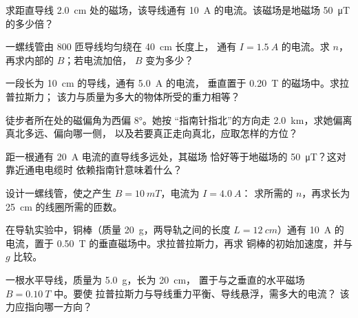 \begin{exercise}[$\star$]\label{exo:g11:magnetic-fields:3}
求距直导线 \qty{2.0}{cm} 处的磁场，该导线通有
\qty{10}{A} 的电流。该磁场是地磁场 \qty{50}{\micro T} 的多少倍？
\end{exercise}

\begin{exercise}[$\star$]\label{exo:g11:magnetic-fields:4}
一螺线管由 $800$ 匝导线均匀绕在 \qty{40}{cm} 长度上，
通有 $I = \qty{1.5}{A}$ 的电流。求 $n$，再求内部的 $B$；若电流加倍，
$B$ 变为多少？
\end{exercise}

\begin{exercise}[$\star$]\label{exo:g11:magnetic-fields:5}
一段长为 \qty{10}{cm} 的导线，通有 \qty{5.0}{A} 的电流，
垂直置于 \qty{0.20}{T} 的磁场中。求拉普拉斯力；
该力与质量为多大的物体所受的重力相等？
\end{exercise}

\begin{exercise}[$\star\star$]\label{exo:g11:magnetic-fields:6}
徒步者所在处的磁偏角为西偏 $\ang{8}$。她按
“指南针指北”的方向走 \qty{2.0}{km}，求她偏离真北多远、偏向哪一侧，
以及若要真正走向真北，应取怎样的方位？
\end{exercise}

\begin{exercise}[$\star\star$]\label{exo:g11:magnetic-fields:7}
距一根通有 \qty{20}{A} 电流的直导线多远处，其磁场
恰好等于地磁场的 \qty{50}{\micro T}？这对靠近通电电缆时
依赖指南针意味着什么？
\end{exercise}

\begin{exercise}[$\star\star$]\label{exo:g11:magnetic-fields:8}
设计一螺线管，使之产生 $B = \qty{10}{mT}$，电流为 $I = \qty{4.0}{A}$：
求所需的 $n$，再求长为 \qty{25}{cm} 的线圈所需的匝数。
\end{exercise}

\begin{exercise}[$\star\star$]\label{exo:g11:magnetic-fields:9}
在导轨实验中，铜棒（质量 \qty{20}{g}，两导轨之间的长度
$L = \qty{12}{cm}$）通有 \qty{10}{A} 的电流，置于
\qty{0.50}{T} 的垂直磁场中。求拉普拉斯力，再求
铜棒的初始加速度，并与 $g$ 比较。
\end{exercise}

\begin{exercise}[$\star\star$]\label{exo:g11:magnetic-fields:10}
一根水平导线，质量为 \qty{5.0}{g}，长为 \qty{20}{cm}，
置于与之垂直的水平磁场 $B = \qty{0.10}{T}$ 中。要使
拉普拉斯力与导线重力平衡、导线悬浮，需多大的电流？
该力应指向哪一方向？
\end{exercise}


